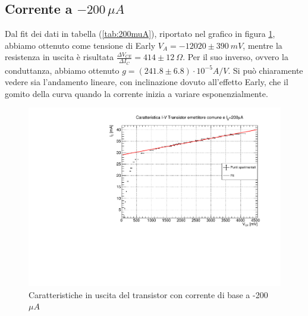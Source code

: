 \documentclass[]{article}
\begin{document}
  \subsection{Corrente a $ -200\,\mu A $}
Dal fit dei dati in tabella (\ref{tab:200muA}), riportato nel grafico in figura \ref{fig:corrente 200}, abbiamo ottenuto come tensione di Early $ V_{A}=-12020\pm390\ mV $, mentre la resistenza in uscita è risultata $ \frac{\Delta V_{CE}}{\Delta I _{C}}=414\pm12\ \Omega$. Per il suo inverso, ovvero la conduttanza, abbiamo ottenuto $ g=(241.8\pm6.8)\cdot 10^{-5} A/V $. Si può chiaramente vedere sia l'andamento lineare, con inclinazione dovuto all'effetto Early, che il gomito della curva quando la corrente inizia a variare esponenzialmente.
\begin{figure}[H]
	\centering
	\includegraphics[width=0.9\linewidth]{../200 muA/c1}
	\caption{Caratteristiche in uscita del transistor con corrente di base a -200 $ \mu A $}
	\label{fig:corrente 200}
\end{figure}
\end{document}

